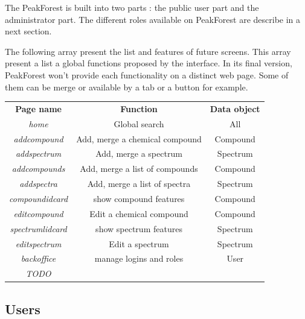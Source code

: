 The PeakForest is built into two parts : the public user part and the administrator part. The different roles available on PeakForest are describe in a next section.

The following array present the list and features of future screens. This array present a list a global functions proposed by the interface. In its final version, PeakForest won't provide each functionality on a distinct web page. Some of them can be merge or available by a tab or a button for example.

\begin{table}[h]
	\centering
	\begin{tabular}{|c|c|c|}
		\cline{1-3}
		\textbf{Page name}   	& 	\textbf{Function}              			& 	\textbf{Data object}		\\ \cline{1-3}
		\textit{home}       		& 	Global search                  			& 	All                  			\\ \cline{1-3}
		\textit{addcompound} 	& 	Add, merge a chemical compound 	&	Compound            		\\ \cline{1-3}
		\textit{addspectrum} 		& 	Add, merge a spectrum          		& 	Spectrum             		\\ \cline{1-3}
		\textit{addcompounds} 	& 	Add, merge a list of compounds 	&	Compound            		\\ \cline{1-3}
		\textit{addspectra} 		& 	Add, merge a list of spectra      		& 	Spectrum             		\\ \cline{1-3}
		\textit{compoundidcard} 		& 	show compound features          	& 	Compound             		\\ \cline{1-3}
		\textit{editcompound} 	& 	Edit a chemical compound 		&	Compound            		\\ \cline{1-3}
		\textit{spectrumlidcard} 		& 	show spectrum features          	& 	Spectrum             		\\ \cline{1-3}
		\textit{editspectrum} 		& 	Edit a spectrum	          		& 	Spectrum             		\\ \cline{1-3}
		\textit{backoffice} 		& 	manage logins and roles           	& 	User		             		\\ \cline{1-3}
		\textit{TODO} 			& 	          						& 			             		\\ \cline{1-3}
	\end{tabular}
\end{table}


\subsection{Users}

